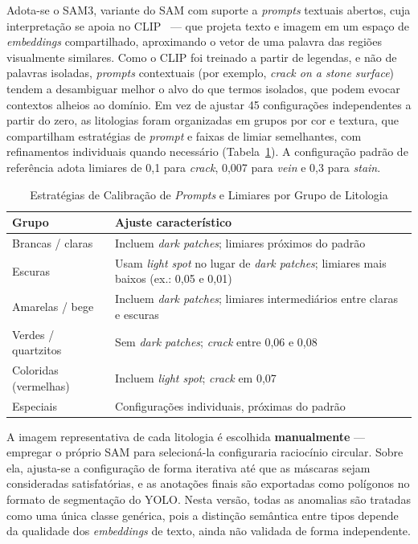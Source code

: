 \documentclass[10pt,conference]{IEEEtran}
\begin{document}
Adota-se o SAM3, variante do SAM com suporte a \textit{prompts} textuais abertos, cuja interpretação se apoia no CLIP~\cite{clip_radford2021} --- que projeta texto e imagem em um espaço de \textit{embeddings} compartilhado, aproximando o vetor de uma palavra das regiões visualmente similares. Como o CLIP foi treinado a partir de legendas, e não de palavras isoladas, \textit{prompts} contextuais (por exemplo, \textit{crack on a stone surface}) tendem a desambiguar melhor o alvo do que termos isolados, que podem evocar contextos alheios ao domínio. Em vez de ajustar 45 configurações independentes a partir do zero, as litologias foram organizadas em grupos por cor e textura, que compartilham estratégias de \textit{prompt} e faixas de limiar semelhantes, com refinamentos individuais quando necessário (Tabela~\ref{tab:calibracao}). A configuração padrão de referência adota limiares de 0,1 para \textit{crack}, 0,007 para \textit{vein} e 0,3 para \textit{stain}.

\begin{table}[!t]
\renewcommand{\arraystretch}{1.2}
\caption{Estratégias de Calibração de \textit{Prompts} e Limiares por Grupo de Litologia}
\label{tab:calibracao}
\centering
\footnotesize
\begin{tabular}{|l|p{5.0cm}|}
\hline
\textbf{Grupo} & \textbf{Ajuste característico} \\
\hline
Brancas / claras & Incluem \textit{dark patches}; limiares próximos do padrão \\
\hline
Escuras & Usam \textit{light spot} no lugar de \textit{dark patches}; limiares mais baixos (ex.: 0,05 e 0,01) \\
\hline
Amarelas / bege & Incluem \textit{dark patches}; limiares intermediários entre claras e escuras \\
\hline
Verdes / quartzitos & Sem \textit{dark patches}; \textit{crack} entre 0,06 e 0,08 \\
\hline
Coloridas (vermelhas) & Incluem \textit{light spot}; \textit{crack} em 0,07 \\
\hline
Especiais & Configurações individuais, próximas do padrão \\
\hline
\end{tabular}
\end{table}

A imagem representativa de cada litologia é escolhida \textbf{manualmente} --- empregar o próprio SAM para selecioná-la configuraria raciocínio circular. Sobre ela, ajusta-se a configuração de forma iterativa até que as máscaras sejam consideradas satisfatórias, e as anotações finais são exportadas como polígonos no formato de segmentação do YOLO. Nesta versão, todas as anomalias são tratadas como uma única classe genérica, pois a distinção semântica entre tipos depende da qualidade dos \textit{embeddings} de texto, ainda não validada de forma independente.
\end{document}
